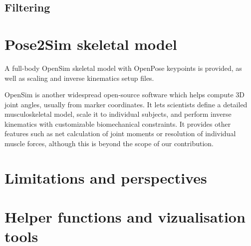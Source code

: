 

\subsection{Filtering}
\blindtext


\section{Pose2Sim skeletal model}

A full-body OpenSim \cite{Delp2007,Seth2018} skeletal model with OpenPose keypoints is provided, as well as scaling and inverse kinematics setup files.

OpenSim is another widespread open-source software which helps compute 3D joint angles, usually from marker coordinates. It lets scientists define a detailed musculoskeletal model, scale it to individual subjects, and perform inverse kinematics with customizable biomechanical constraints. It provides other features such as net calculation of joint moments or resolution of individual muscle forces, although this is beyond the scope of our contribution.


\section{Limitations and perspectives}
\blindtext


\section{Helper functions and vizualisation tools}
\blindtext

